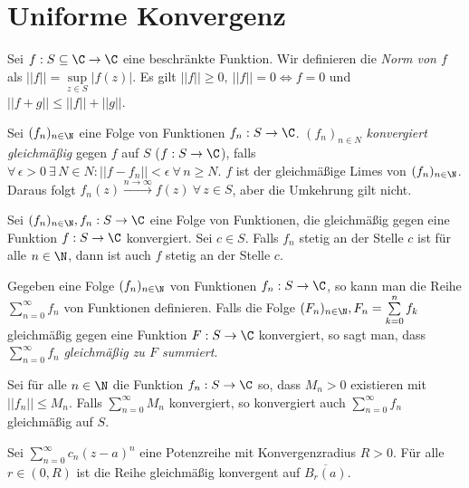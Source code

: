 \section{Uniforme Konvergenz}\lecture
		
		Sei $ f: S \subseteq \C \to \C $ eine beschränkte Funktion. Wir definieren die \emph{Norm von $f$} als $ ||f||=\sup\limits_{z \in S} |f(z)| $. Es gilt $ ||f|| \geq 0,\ ||f||=0 \iff f=0 $ und $ ||f+g|| \leq ||f||+||g|| $. 
		
		\begin{defn}
			Sei $ (f_n)_{n \in \N} $ eine Folge von Funktionen $ f_n: S \to \C $. $ (f_n)_{n \in N} $ \emph{konvergiert gleichmäßig} gegen $f$ auf $S$ ($ f: S \to \C $), falls $ \forall\, \epsilon > 0 \ \exists\, N \in N: ||f-f_n|| < \epsilon \ \forall\, n \geq N $. $f$ ist der gleichmäßige Limes von $ (f_n)_{n \in \N} $. Daraus folgt $ f_n(z) \overset{n \to \infty}{\longrightarrow} f(z) \ \forall\, z \in S $, aber die Umkehrung gilt nicht.
		\end{defn}
		
		\begin{thm}
			Sei $ (f_n)_{n \in \N}, f_n:S \to \C $ eine Folge von Funktionen, die gleichmäßig gegen eine Funktion $ f: S \to \C $ konvergiert. Sei $c \in S$. Falls $ f_n $ stetig an der Stelle $c$ ist für alle $n \in \N$, dann ist auch $f$ stetig an der Stelle $c$. 
		\end{thm}
		
		\begin{defn}
			Gegeben eine Folge $ (f_n)_{n \in \N} $ von Funktionen $ f_n: S \to \C $, so kann man die Reihe $ \sum\limits_{n=0}^\infty f_n $ von Funktionen definieren. Falls die Folge $ (F_n)_{n \in \N}, F_n = \sum\limits_{k=0}^n f_k $ gleichmäßig gegen eine Funktion $ F: S \to \C $ konvergiert, so sagt man, dass $ \sum\limits_{n=0}^\infty f_n $ \emph{gleichmäßig zu $F$ summiert}.
		\end{defn}
		
		\begin{thmn}
			Sei für alle $ n \in \N $ die Funktion $ f_n:S \to \C $ so, dass $ M_n > 0 $ existieren mit $ ||f_n|| \leq M_n $. Falls $ \sum\limits_{n=0}^\infty M_n $ konvergiert, so konvergiert auch $ \sum\limits_{n=0}^\infty f_n $ gleichmäßig auf $S$.
		\end{thmn}
		
		\begin{cor}
			Sei $ \sum\limits_{n=0}^\infty c_n (z-a)^n $ eine Potenzreihe mit Konvergenzradius $ R > 0 $. Für alle $ r \in (0,R) $ ist die Reihe gleichmäßig konvergent auf $ \overbar{B_r(a)} $.
		\end{cor}
		
